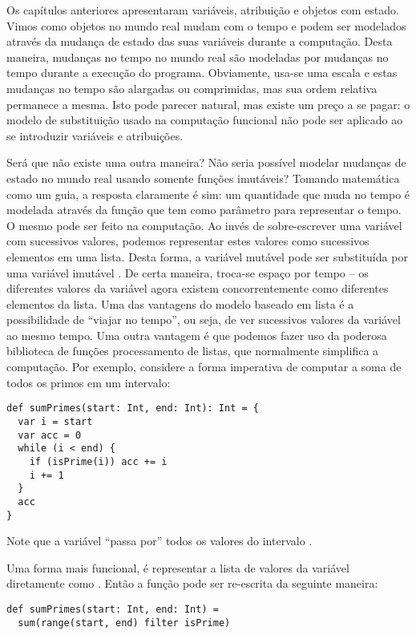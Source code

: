 Os capítulos anteriores apresentaram variáveis, atribuição e objetos com estado.
Vimos como objetos no mundo real mudam com o tempo e podem ser modelados através da
mudança de estado das suas variáveis durante a computação. Desta maneira, mudanças no 
tempo no mundo real  são modeladas por mudanças no tempo durante a execução do programa.
Obviamente, usa-se uma escala e estas mudanças no tempo são alargadas ou comprimidas, mas
sua ordem relativa permanece a mesma. Isto pode parecer natural, mas existe um preço a se
pagar: o modelo de substituição usado na computação funcional não pode ser aplicado ao se
introduzir variáveis e atribuições.

Será que não existe uma outra maneira? Não seria possível modelar mudanças de estado no mundo
real usando somente funções imutáveis? Tomando matemática como um guia, a resposta claramente é sim:
um quantidade que muda no tempo é modelada através da função  que tem como parâmetro 
para representar o tempo. O mesmo pode ser feito na computação. Ao invés de sobre-escrever uma variável com
sucessivos valores, podemos representar estes valores como sucessivos elementos em uma lista.
Desta forma, a variável mutável  pode ser substituída por uma variável imutável . 
De certa maneira, troca-se espaço por tempo -- os diferentes valores da variável agora existem concorrentemente como
diferentes elementos da lista. Uma das vantagens do modelo baseado em lista é a possibilidade de ``viajar no tempo'', ou seja,
de ver sucessivos valores da variável ao mesmo tempo. Uma outra vantagem é que podemos fazer uso da poderosa biblioteca de 
funções processamento de listas, que normalmente simplifica a computação. Por exemplo, considere a forma imperativa de computar
a soma de todos os primos em um intervalo:
\begin{lstlisting}
def sumPrimes(start: Int, end: Int): Int = {
  var i = start
  var acc = 0
  while (i < end) {
    if (isPrime(i)) acc += i
    i += 1
  }
  acc
}
\end{lstlisting}
Note que a variável  ``passa por'' todos os valores do intervalo
.

Uma forma mais funcional, é representar a lista de valores da variável  diretamente como . 
Então a função pode ser re-escrita da seguinte maneira:
\begin{lstlisting}
def sumPrimes(start: Int, end: Int) =
  sum(range(start, end) filter isPrime)
\end{lstlisting}

